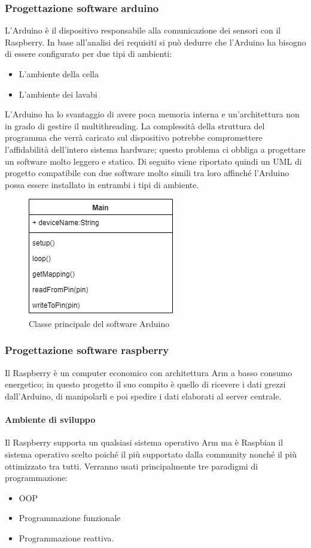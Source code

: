 \documentclass[12pt]{article}
\begin{document}
\subsubsection{Progettazione software arduino}
L'Arduino è il dispositivo responsabile alla comunicazione dei sensori con il Raspberry.
In base all'analisi dei requisiti si può dedurre che l'Arduino ha bisogno di essere configurato per due tipi di ambienti:
\begin{itemize}
\item L'ambiente della cella
\item L'ambiente dei lavabi
\end{itemize}
L'Arduino ha lo svantaggio di avere poca memoria interna e un'architettura non in grado di gestire il multithreading. La complessità della struttura del programma che verrà caricato sul dispositivo potrebbe compromettere l'affidabilità dell'intero sistema hardware; questo problema ci obbliga a progettare un software molto leggero e statico.
Di seguito viene riportato quindi un UML di progetto compatibile con due software molto simili tra loro affinché l'Arduino possa essere installato in entrambi i tipi di ambiente. 
\begin{figure}[h!]
\centering
	\includegraphics[scale=0.55]{img/parteLocale/SoftwareArduino.png}  
    \caption{Classe principale del software Arduino}
\end{figure}
\subsubsection{Progettazione software raspberry}
Il Raspberry è un computer economico con architettura Arm a basso consumo energetico; in questo progetto il suo compito è quello di ricevere i dati grezzi dall'Arduino, di manipolarli e poi spedire i dati elaborati al server centrale.
\paragraph{Ambiente di sviluppo}
Il Raspberry supporta un qualsiasi sistema operativo Arm ma è Raspbian il sistema operativo scelto poiché il più supportato dalla community nonché il più ottimizzato tra tutti. Verranno usati principalmente tre paradigmi di programmazione: 
\begin{itemize}
\item OOP
\item Programmazione funzionale 
\item Programmazione reattiva. 
\end{itemize}
\end{document}
